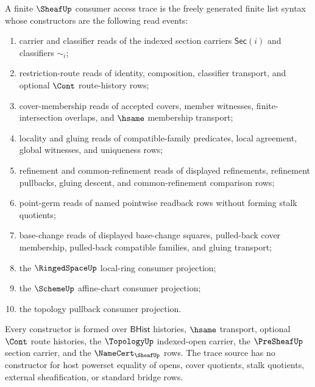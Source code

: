 \begin{definition}
\label{def:sheaf-consumer-access-trace-source}
A finite $\SheafUp$ consumer access trace is the freely generated finite list syntax whose constructors are the following read events:
\begin{enumerate}
\item carrier and classifier reads of the indexed section carriers $\mathsf{Sec}(i)$ and classifiers $\sim_i$;
\item restriction-route reads of identity, composition, classifier transport, and optional $\Cont$ route-history rows;
\item cover-membership reads of accepted covers, member witnesses, finite-intersection overlaps, and $\hsame$ membership transport;
\item locality and gluing reads of compatible-family predicates, local agreement, global witnesses, and uniqueness rows;
\item refinement and common-refinement reads of displayed refinements, refinement pullbacks, gluing descent, and common-refinement comparison rows;
\item point-germ reads of named pointwise readback rows without forming stalk quotients;
\item base-change reads of displayed base-change squares, pulled-back cover membership, pulled-back compatible families, and gluing transport;
\item the $\RingedSpaceUp$ local-ring consumer projection;
\item the $\SchemeUp$ affine-chart consumer projection;
\item the topology pullback consumer projection.
\end{enumerate}
Every constructor is formed over $\mathsf{BHist}$ histories, $\hsame$ transport, optional $\Cont$ route histories, the $\TopologyUp$ indexed-open carrier, the $\PreSheafUp$ section carrier, and the $\NameCert_{\SheafUp}$ rows. The trace source has no constructor for host powerset equality of opens, cover quotients, stalk quotients, external sheafification, or standard bridge rows.
\end{definition}

